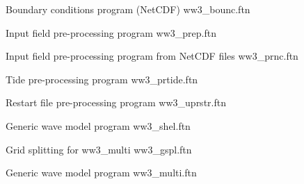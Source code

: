 \noindent
Boundary conditions program (NetCDF) \hfill {\file ww3\_bounc.ftn}

\begin{flisti}
\end{flisti}

\noindent
Input field pre-processing program \hfill {\file ww3\_prep.ftn}

\noindent
Input field pre-processing program from NetCDF files \hfill {\file ww3\_prnc.ftn}

\begin{flisti}
\end{flisti}

\noindent
Tide pre-processing program \hfill {\file ww3\_prtide.ftn}

\begin{flisti}
\end{flisti}

\noindent
Restart file pre-processing program \hfill {\file ww3\_uprstr.ftn}

\begin{flisti}
\end{flisti}

\noindent
Generic wave model program \hfill {\file ww3\_shel.ftn}

\begin{flisti}
\end{flisti}


% 

\noindent
Grid splitting for {\file ww3\_multi} \hfill {\file ww3\_gspl.ftn}

\begin{flisti}
\end{flisti}

\noindent
Generic wave model program \hfill {\file ww3\_multi.ftn}

\begin{flisti}
\end{flisti}

